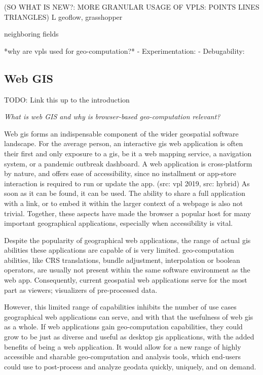 \begin{note}
  (SO WHAT IS NEW?: MORE GRANULAR USAGE OF VPLS: POINTS LINES TRIANGLES)
  L geoflow, grasshopper
  
  neighboring fields
\end{note}

*why are vpls used for geo-computation?* 
- Experimentation: 
- Debugability: 


\subsection*{Web GIS}

\begin{note}
TODO: Link this up to the introduction
\end{note}

\emph{What is web GIS and why is browser-based geo-computation relevant?}

Web \ac{gis} forms an indispensable component of the wider geospatial software landscape. 
For the average person, an interactive \ac{gis} web application is often their first and only exposure to a \acs{gis}, be it a web mapping service, a navigation system, or a pandemic outbreak dashboard. 
A web application is cross-platform by nature, and offers ease of accessibility, since no installment or app-store interaction is required to run or update the app. (src: vpl 2019, src: hybrid)
As soon as it can be found, it can be used.
The ability to share a full application with a link, or to embed it within the larger context of a webpage is also not trivial. 
Together, these aspects have made the browser a popular host for many important geographical applications, especially when accessibility is vital.

Despite the popularity of geographical web applications, the range of actual \ac{gis} abilities these applications are capable of is very limited. \ac{geo-computation} abilities, like CRS translations, bundle adjustment, interpolation or boolean operators, are usually not present within the same software environment as the web app. Consequently, current geospatial web applications serve for the most part as viewers; visualizers of pre-processed data. 

However, this limited range of capabilities inhibits the number of use cases geographical web applications can serve, and with that the usefulness of web \ac{gis} as a whole.
If web applications gain \ac{geo-computation} capabilities, they could grow to be just as diverse and useful as desktop \ac{gis} applications, with the added benefits of being a web application. It would allow for a new range of highly accessible and sharable geo-computation and analysis tools, which end-users could use to post-process and analyze geodata quickly, uniquely, and on demand.

